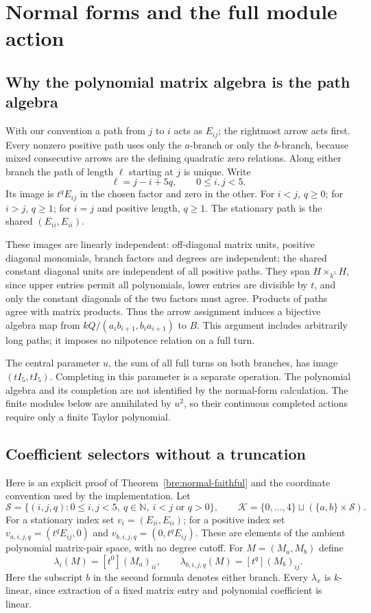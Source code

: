 \section{Normal forms and the full module action}\label{bre:details}
\subsection{Why the polynomial matrix algebra is the path algebra}
With our convention a path from $j$ to $i$ acts as $E_{ij}$; the
rightmost arrow acts first. Every nonzero positive path uses only the
$a$-branch or only the $b$-branch, because mixed consecutive arrows
are the defining quadratic zero relations. Along either branch the path
of length $\ell$ starting at $j$ is unique. Write
\[
 \ell=j-i+5q,\qquad 0\leq i,j<5.
\]
Its image is $t^qE_{ij}$ in the chosen factor and zero in the other.
For $i<j$, $q\geq0$; for $i>j$, $q\geq1$; for $i=j$ and
positive length, $q\geq1$. The stationary path is the shared
$(E_{ii},E_{ii})$.

These images are linearly independent: off-diagonal matrix units,
positive diagonal monomials, branch factors and degrees are independent;
the shared constant diagonal units are independent of all positive
paths. They span $H\times_{k^5}H$, since upper entries permit all
polynomials, lower entries are divisible by $t$, and only the constant
diagonals of the two factors must agree. Products of paths agree with
matrix products. Thus the arrow assignment induces a bijective algebra
map from $kQ/(a_ib_{i+1},b_ia_{i+1})$ to $B$. This argument includes
arbitrarily long paths; it imposes no nilpotence relation on a full turn.

The central parameter $u$, the sum of all full turns on both branches,
has image $(tI_5,tI_5)$. Completing in this parameter is a separate
operation. The polynomial algebra and its completion are not identified
by the normal-form calculation. The finite modules below are annihilated
by $u^2$, so their continuous completed actions require only a finite
Taylor polynomial.

\subsection{Coefficient selectors without a truncation}
Here is an explicit proof of Theorem~\ref{bre:normal-faithful} and the
coordinate convention used by the implementation. Let
\[
 \mathcal S=\{(i,j,q):0\leq i,j<5,\ q\in\mathbb N,
                      \ i<j\text{ or }q>0\},\qquad
 \mathcal K=\{0,\ldots,4\}\sqcup(\{a,b\}\times\mathcal S).
\]
For a stationary index set $v_i=(E_{ii},E_{ii})$; for a positive index
set $v_{a,i,j,q}=(t^qE_{ij},0)$ and
$v_{b,i,j,q}=(0,t^qE_{ij})$. These are elements of the ambient polynomial
matrix-pair space, with no degree cutoff. For $M=(M_a,M_b)$ define
\[
 \lambda_i(M)=[t^0](M_a)_{ii},\qquad
 \lambda_{b,i,j,q}(M)=[t^q](M_b)_{ij}.
\]
Here the subscript $b$ in the second formula denotes either branch.
Every $\lambda_x$ is $k$-linear, since extraction of a fixed matrix entry
and polynomial coefficient is linear.


